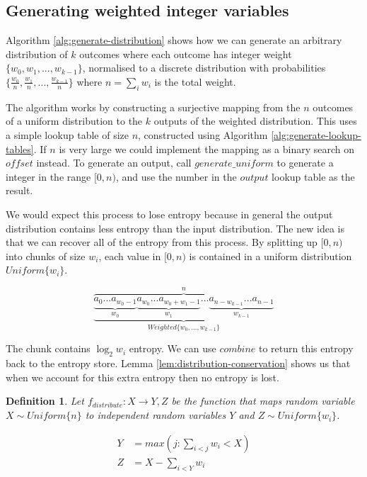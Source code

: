 \documentclass[12pt]{article}
\newtheorem{definition}{Definition}
\begin{document}
\subsection{Generating weighted integer variables}

Algorithm \ref{alg:generate-distribution} shows how we can generate an arbitrary  distribution of $k$ outcomes where each outcome has integer weight $\{w_0, w_1, ..., w_{k-1}\}$, normalised to a discrete distribution with probabilities $\{\frac{w_0}{n}, \frac{w_1}{n}, ..., \frac{w_{k-1}}{n}\}$ where $n=\sum_i w_i$ is the total weight.

The algorithm works by constructing a surjective mapping from the $n$ outcomes of a uniform distribution to the $k$ outputs of the weighted distribution. This uses a simple lookup table of size $n$, constructed using Algorithm \ref{alg:generate-lookup-tables}. If $n$ is very large we could implement the mapping as a binary search on $offset$ instead. To generate an output, call $generate\_uniform$ to generate a integer in the range $[0,n)$, and use the number in the $output$ lookup table as the result. 

We would expect this process to lose entropy because in general the output distribution contains less entropy than the input distribution. The new idea is that we can recover all of the entropy from this process. By splitting up $[0,n)$ into chunks of size $w_i$, each value in $[0,n)$ is contained in a uniform distribution $Uniform\{w_i\}$.

\[
\overbrace{
    \underbrace{
        \underbrace{a_0 ... a_{w_0-1}}_{w_0}
          \underbrace{a_{w_0} ... a_{w_0+w_1-1}}_{w_1}
          ...
          \underbrace{
             a_{n-w_{k-1}} ... 
             a_{n-1}
         }_{w_{k-1}}
    }_{Weighted\{w_0, ..., w_{k-1}\}}
}^{n}
\]

The chunk contains $\log_2w_i$ entropy. We can use $combine$ to return this entropy back to the entropy store. Lemma \ref{lem:distribution-conservation} shows us that when we account for this extra entropy then no entropy is lost.



\begin{definition}
    Let $f_{distribute}: X \rightarrow Y, Z$ be the function that maps random variable $X \sim Uniform\{n\}$ to independent random variables $Y$ and $Z \sim Uniform\{w_i\}$.

    \begin{align}
    Y &= max(j : \sum_{i<j}w_i<X) \\
    Z &= X - \sum_{i<Y}w_i
    \end{align}

\end{definition}
\end{document}
